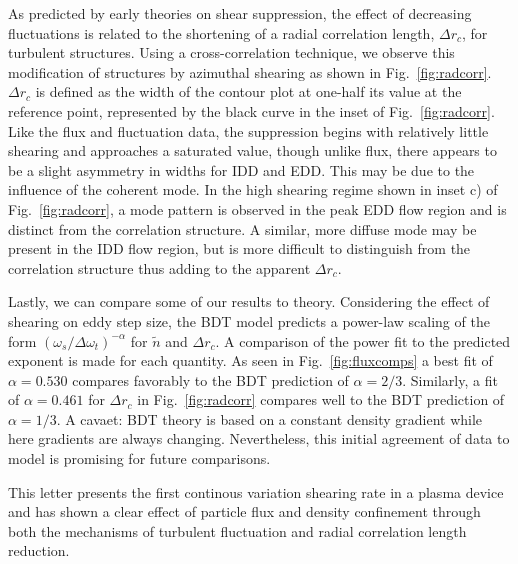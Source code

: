 \documentclass[%
 aps,
 prl,
 amsmath,amssymb,
 reprint,%
]{revtex4-1}
\begin{document}
As predicted by early theories on shear suppression, the effect of decreasing fluctuations is related to the shortening of a radial correlation length, $\Delta r_{c}$, for turbulent structures. Using a cross-correlation technique, we observe this modification of structures by azimuthal shearing as shown in Fig.~\ref{fig:radcorr}. $\Delta r_{c}$ is defined as the width of the contour plot at one-half its value at the reference point, represented by the black curve in the inset of Fig.~\ref{fig:radcorr}. Like the flux and fluctuation data, the suppression begins with relatively little shearing and approaches a saturated value, though unlike flux, there appears to be a slight asymmetry in widths for IDD and EDD. This may be due to the influence of the coherent mode. In the high shearing regime shown in inset c) of Fig.~\ref{fig:radcorr}, a mode pattern is observed in the peak EDD flow region and is distinct from the correlation structure. A similar, more diffuse mode may be present in the IDD flow region, but is more difficult to distinguish from the correlation structure thus adding to the apparent $\Delta r_{c}$.

Lastly, we can compare some of our results to theory. Considering the effect of shearing on eddy step size, the BDT model \cite{biglari90} predicts a power-law scaling of the form $\left(\omega_{s}/\Delta \omega_{t}\right)^{-\alpha}$ for $\tilde{n}$ and $\Delta r_{c}$. A comparison of the power fit to the predicted exponent is made for each quantity. As seen in Fig.~\ref{fig:fluxcomps} a best fit of $\alpha = 0.530$ compares favorably to the BDT prediction of $\alpha = 2/3$. Similarly, a fit of $\alpha = 0.461$ for $\Delta r_{c}$ in Fig.~\ref{fig:radcorr} compares well to the BDT prediction of $\alpha = 1/3$. A cavaet: BDT theory is based on a constant density gradient while here gradients are always changing. Nevertheless, this initial agreement of data to model is promising for future comparisons.



This letter presents the first continous variation shearing rate in a plasma device and has shown a clear effect of particle flux and density confinement through both the mechanisms of turbulent fluctuation and radial correlation length reduction.

\end{document}
